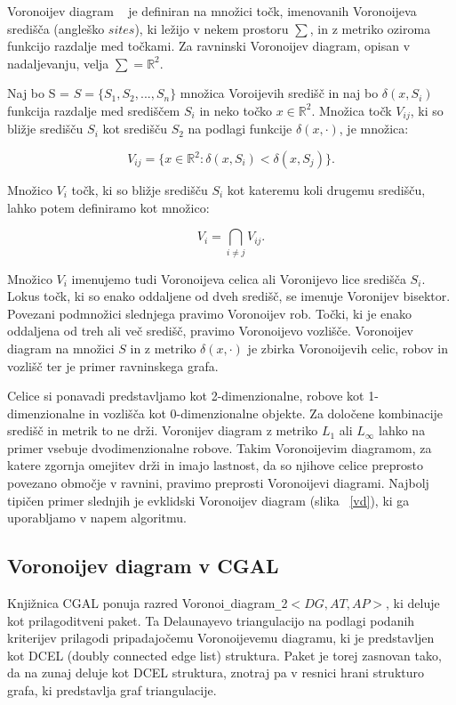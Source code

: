 \documentclass[a4paper, 12pt]{book}
\begin{document}
Voronoijev diagram ~\cite{cgalVor} je definiran na množici točk, imenovanih Voronoijeva središča (angleško $sites$), ki ležijo v nekem prostoru $\sum$, in z metriko oziroma funkcijo razdalje med točkami. Za ravninski Voronoijev diagram, opisan v nadaljevanju, velja $\sum = \mathbb{R}^2$.

Naj bo S = $S = \{S_1,S_2,...,S_n\}$ množica Voroijevih središč in naj bo $\delta(x,S_i)$ funkcija razdalje med središčem $S_i$ in neko točko $x \in \mathbb{R}^2$. Množica točk $V_{ij}$, ki so bližje središču $S_i$ kot središču $S_2$ na podlagi funkcije $\delta(x,\cdot)$, je množica:

\begin{equation}
V_{ij} = \{x \in \mathbb{R}^2: \delta(x,S_i) < \delta(x,S_j)\}. 
\end{equation}

Množico $V_i$ točk, ki so bližje središču $S_i$ kot kateremu koli drugemu središču, lahko potem definiramo kot množico:

\begin{equation}
V_i = \bigcap_{i \neq j} V_{ij} .
\end{equation}



Množico $V_i$ imenujemo tudi Voronoijeva celica ali Voronijevo lice središča $S_i$. Lokus točk, ki so enako oddaljene od dveh središč, se imenuje Voronijev bisektor. Povezani podmnožici slednjega pravimo Voronoijev rob. Točki, ki je enako oddaljena od treh ali več središč, pravimo Voronoijevo vozlišče. Voronoijev diagram na množici $S$ in z metriko $\delta(x,\cdot)$ je zbirka Voronoijevih celic, robov in vozlišč ter je primer ravninskega grafa.

Celice si ponavadi predstavljamo kot 2-dimenzionalne, robove kot 1-dimenzionalne in vozlišča kot 0-dimenzionalne objekte. Za določene kombinacije središč in metrik to ne drži. Voronijev diagram z metriko $L_1$ ali $L_{\infty}$ lahko na primer vsebuje dvodimenzionalne robove. Takim Voronoijevim diagramom, za katere zgornja omejitev drži in imajo lastnost, da so njihove celice preprosto povezano območje v ravnini, pravimo preprosti Voronoijevi diagrami. Najbolj tipičen primer slednjih je evklidski Voronoijev diagram (slika ~\ref{vd}), ki ga uporabljamo v napem algoritmu.

\subsection{Voronoijev diagram v CGAL}
Knjižnica CGAL ponuja razred Voronoi\texttt{\_}diagram\texttt{\_}2$<DG,AT,AP>$, ki deluje kot prilagoditveni paket. Ta Delaunayevo triangulacijo na podlagi podanih kriterijev prilagodi pripadajočemu Voronoijevemu diagramu, ki je predstavljen kot DCEL (doubly connected edge list) struktura. Paket je torej zasnovan tako, da na zunaj deluje kot DCEL struktura, znotraj pa v resnici hrani strukturo grafa, ki predstavlja graf triangulacije.
\end{document}
